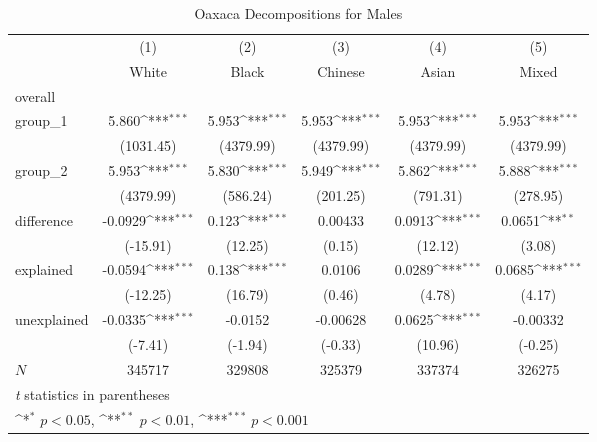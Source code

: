 \begin{table}[htbp]\centering
\def\sym#1{\ifmmode^{#1}\else\(^{#1}\)\fi}
\caption{Oaxaca Decompositions for Males\label{tab1}}
\begin{tabular}{l*{5}{c}}
\hline\hline
            &\multicolumn{1}{c}{(1)}&\multicolumn{1}{c}{(2)}&\multicolumn{1}{c}{(3)}&\multicolumn{1}{c}{(4)}&\multicolumn{1}{c}{(5)}\\
            &\multicolumn{1}{c}{White}&\multicolumn{1}{c}{Black}&\multicolumn{1}{c}{Chinese}&\multicolumn{1}{c}{Asian}&\multicolumn{1}{c}{Mixed}\\
\hline
overall     &                     &                     &                     &                     &                     \\
group\_1     &       5.860\sym{***}&       5.953\sym{***}&       5.953\sym{***}&       5.953\sym{***}&       5.953\sym{***}\\
            &   (1031.45)         &   (4379.99)         &   (4379.99)         &   (4379.99)         &   (4379.99)         \\
group\_2     &       5.953\sym{***}&       5.830\sym{***}&       5.949\sym{***}&       5.862\sym{***}&       5.888\sym{***}\\
            &   (4379.99)         &    (586.24)         &    (201.25)         &    (791.31)         &    (278.95)         \\
difference  &     -0.0929\sym{***}&       0.123\sym{***}&     0.00433         &      0.0913\sym{***}&      0.0651\sym{**} \\
            &    (-15.91)         &     (12.25)         &      (0.15)         &     (12.12)         &      (3.08)         \\
explained   &     -0.0594\sym{***}&       0.138\sym{***}&      0.0106         &      0.0289\sym{***}&      0.0685\sym{***}\\
            &    (-12.25)         &     (16.79)         &      (0.46)         &      (4.78)         &      (4.17)         \\
unexplained &     -0.0335\sym{***}&     -0.0152         &    -0.00628         &      0.0625\sym{***}&    -0.00332         \\
            &     (-7.41)         &     (-1.94)         &     (-0.33)         &     (10.96)         &     (-0.25)         \\
\hline
\(N\)       &      345717         &      329808         &      325379         &      337374         &      326275         \\
\hline\hline
\multicolumn{6}{l}{\footnotesize \textit{t} statistics in parentheses}\\
\multicolumn{6}{l}{\footnotesize \sym{*} \(p<0.05\), \sym{**} \(p<0.01\), \sym{***} \(p<0.001\)}\\
\end{tabular}
\end{table}

